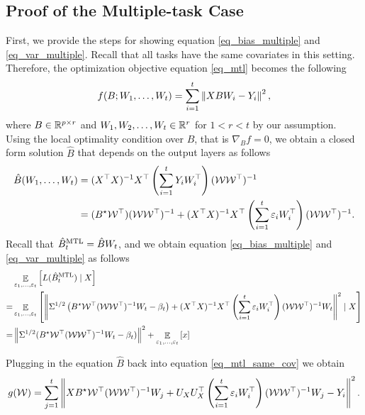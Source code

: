 \subsection{Proof of the Multiple-task Case}\label{app_proof_many_tasks}

	First, we provide the steps for showing equation \eqref{eq_bias_multiple} and \eqref{eq_var_multiple}.
	Recall that all tasks have the same covariates in this setting.
	Therefore, the optimization objective equation \eqref{eq_mtl} becomes the following
	\begin{align}
		f(B; W_1, \dots, W_t) = \sum_{i=1}^t \left\| X B W_i - Y_i \right\|^2, \label{eq_mtl_same_cov}
	\end{align}
	where $B \in \mathbb{R}^{p \times r}$ and $W_1, W_2, \dots, W_t \in \mathbb{R}^r$ for $1 < r < t$ by our assumption.
	Using the local optimality condition over $B$, that is $\nabla_B f = 0$, we obtain a closed form solution $\hat{B}$ that depends on the output layers as follows
	\begin{align*}
		\hat{B}(W_1, \dots, W_t) &= (X^{\top}X)^{-1} X^{\top} \left({\sum_{i=1}^t Y_i W_i^{\top}}\right) (\mathcal W  \mathcal W^{\top})^{-1} \\
		&= (B^\star \mathcal W ^{\top}) (\mathcal W \mathcal W ^{\top})^{-1} + (X^{\top}X)^{-1}X^{\top}   \left({\sum_{i=1}^t \varepsilon_i W_i^{\top}}\right) (\mathcal W \mathcal W^{\top})^{-1}.
	\end{align*}
	Recall that $\hat{B}_t^{\textup{MTL}} = \hat{B} W_t$, and we obtain equation \eqref{eq_bias_multiple} and \eqref{eq_var_multiple} as follows
	\begin{align*}
		 & \mathop{\mathbb{E}}_{\varepsilon_1, \dots, \varepsilon_t}\left[ L(\hat{B}_t^{\textup{MTL}}) \mid X \right] \\
		=& \mathop{\mathbb{E}}_{\varepsilon_1, \dots, \varepsilon_t}\left[ \left\| \Sigma^{1/2} \left({B^{\star} {\mathcal W}^{\top} ({\mathcal W} {\mathcal W}^{\top})^{-1}W_t - \beta_t}\right) + (X^{\top}X)^{-1} X^{\top} \left({\sum_{i=1}^t \varepsilon_i W_i^{\top}}\right) ({\mathcal W} {\mathcal W}^{\top})^{-1} W_t \right\|^2 \mid X \right] \\
		=& \left\| \Sigma^{1/2} (B^{\star} {\mathcal W}^{\top} ({\mathcal W} {\mathcal W}^{\top})^{-1} W_t - \beta_t) \right\|^2
		+ \mathop{\mathbb{E}}_{\varepsilon_1, \dots, \varepsilon_t}\left[ x \right]
	\end{align*}

	Plugging in the equation $\hat{B}$ back into equation \eqref{eq_mtl_same_cov} we obtain
	\begin{align}
		g(\mathcal W) = \sum_{j=1}^t \left\| X B^{\star} {\mathcal W}^{\top} ({\mathcal W}{\mathcal W}^{\top})^{-1} W_j + U_X U_X^{\top} \left({\sum_{i=1}^t \varepsilon_i W_i^{\top}}\right) ({\mathcal W}{\mathcal W}^{\top})^{-1} W_j - Y_i \right\|^2. \label{eq_mtl_output_layer}
	\end{align}

